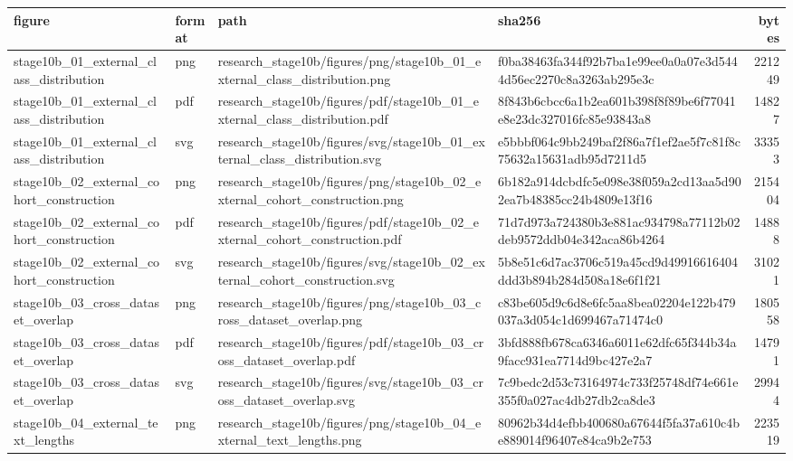 \begin{tabular}{llllr}
\toprule
figure & format & path & sha256 & bytes \\
\midrule
stage10b\_01\_external\_class\_distribution & png & research\_stage10b/figures/png/stage10b\_01\_external\_class\_distribution.png & f0ba38463fa344f92b7ba1e99ee0a0a07e3d5444d56ec2270c8a3263ab295e3c & 221249 \\
stage10b\_01\_external\_class\_distribution & pdf & research\_stage10b/figures/pdf/stage10b\_01\_external\_class\_distribution.pdf & 8f843b6cbcc6a1b2ea601b398f8f89be6f77041e8e23dc327016fc85e93843a8 & 14827 \\
stage10b\_01\_external\_class\_distribution & svg & research\_stage10b/figures/svg/stage10b\_01\_external\_class\_distribution.svg & e5bbbf064c9bb249baf2f86a7f1ef2ae5f7c81f8c75632a15631adb95d7211d5 & 33353 \\
stage10b\_02\_external\_cohort\_construction & png & research\_stage10b/figures/png/stage10b\_02\_external\_cohort\_construction.png & 6b182a914dcbdfc5e098e38f059a2cd13aa5d902ea7b48385cc24b4809e13f16 & 215404 \\
stage10b\_02\_external\_cohort\_construction & pdf & research\_stage10b/figures/pdf/stage10b\_02\_external\_cohort\_construction.pdf & 71d7d973a724380b3e881ac934798a77112b02deb9572ddb04e342aca86b4264 & 14888 \\
stage10b\_02\_external\_cohort\_construction & svg & research\_stage10b/figures/svg/stage10b\_02\_external\_cohort\_construction.svg & 5b8e51c6d7ac3706c519a45cd9d49916616404ddd3b894b284d508a18e6f1f21 & 31021 \\
stage10b\_03\_cross\_dataset\_overlap & png & research\_stage10b/figures/png/stage10b\_03\_cross\_dataset\_overlap.png & c83be605d9c6d8e6fc5aa8bea02204e122b479037a3d054c1d699467a71474c0 & 180558 \\
stage10b\_03\_cross\_dataset\_overlap & pdf & research\_stage10b/figures/pdf/stage10b\_03\_cross\_dataset\_overlap.pdf & 3bfd888fb678ca6346a6011e62dfc65f344b34a9facc931ea7714d9bc427e2a7 & 14791 \\
stage10b\_03\_cross\_dataset\_overlap & svg & research\_stage10b/figures/svg/stage10b\_03\_cross\_dataset\_overlap.svg & 7c9bedc2d53c73164974c733f25748df74e661e355f0a027ac4db27db2ca8de3 & 29944 \\
stage10b\_04\_external\_text\_lengths & png & research\_stage10b/figures/png/stage10b\_04\_external\_text\_lengths.png & 80962b34d4efbb400680a67644f5fa37a610c4be889014f96407e84ca9b2e753 & 223519 \\

\end{tabular}

